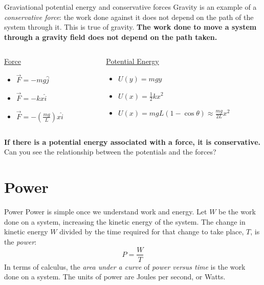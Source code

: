 \documentclass{beamer}
\begin{document}
\begin{frame}{Graviational potential energy and conservative forces}
Gravity is an example of a \textit{conservative force}: the work done against it does not depend on the path of the system through it.  This is true of gravity.  \textbf{The work done to move a system through a gravity field does not depend on the path taken.} \\ \vspace{1cm}
\begin{columns}[T]
\begin{column}{0.3\textwidth}
\centering
\underline{Force}
\begin{itemize}
\item $\vec{F} = -mg\hat{j}$
\item $\vec{F} = -kx\hat{i}$
\item $\vec{F} = -\left(\frac{mg}{L}\right)x\hat{i}$
\end{itemize}
\end{column}
\begin{column}{0.7\textwidth}
\centering
\underline{Potential Energy}
\begin{itemize}
\item $U(y) = mgy$
\item $U(x) = \frac{1}{2}kx^2$
\item $U(x) = mgL(1-\cos\theta) \approx \frac{mg}{2L}x^2$
\end{itemize}
\end{column}
\end{columns} \vspace{0.5cm}
\small
\textbf{If there is a potential energy associated with a force, it is conservative.}  Can you see the relationship between the potentials and the forces?
\end{frame}

\section{Power}

\begin{frame}{Power}
Power is simple once we understand work and energy.  Let $W$ be the work done on a system, increasing the kinetic energy of the system.  The change in kinetic energy $W$ divided by the time required for that change to take place, $T$, is the \alert{\textit{power}}:
\begin{equation}
\boxed{
P = \frac{W}{T}
}
\end{equation}
In terms of calculus, the \textit{area under a curve} of \textit{power versus time} is the work done on a system.  The units of power are Joules per second, or Watts.
\end{frame}
\end{document}
